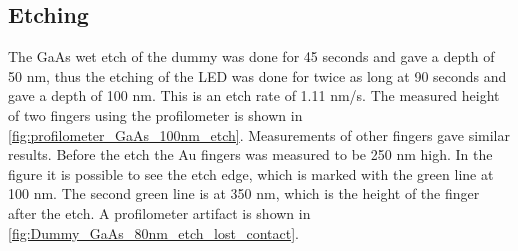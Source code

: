 








\subsection{Etching}

\noindent The GaAs wet etch of the dummy was done for 45 seconds and gave a depth of 50 nm, thus the etching of the LED was done for twice as long at 90 seconds and gave a depth of 100 nm.
This is an etch rate of 1.11 nm/s.
The measured height of two fingers using the profilometer is shown in \autoref{fig:profilometer_GaAs_100nm_etch}.
Measurements of other fingers gave similar results.
Before the etch the Au fingers was measured to be 250 nm high.
In the figure it is possible to see the etch edge, which is marked with the green line at 100 nm. 
The second green line is at 350 nm, which is the height of the finger after the etch.
A profilometer artifact is shown in \autoref{fig:Dummy_GaAs_80nm_etch_lost_contact}.



